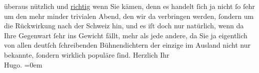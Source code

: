 \begin{ledgroupsized}[t]{13cm}
               überaus nützlich und \uline{richtig} wenn Sie {\pb}kämen, denn es handelt ſich ja
               nicht ſo ſehr um den mehr minder trivialen Abend, den wir da verbringen werden,
               ſondern um die Rückwirkung nach der Schweiz hin,
               und es iſt doch nur natürlich, wenn da Ihre Gegenwart ſehr ins Gewicht fällt, mehr
               als jede andere, da Sie ja eigentlich von allen deutſch ſchreibenden Bühnendichtern
               der einzige \introOben{}im Ausland\introOben{} nicht nur bekannte, ſondern wirklich
               populäre ſind.\pend
           \pstart
           Herzlich Ihr{\\[\baselineskip]}\spacefill\mbox{Hugo.}\pend
           \leftskip=0em{}\endnumbering{}\end{ledgroupsized}  \newcommand{\dateiname}{L02259}\newcommand{\titel}{Hugo von Hofmannsthal an Arthur Schnitzler, 30. 4. [1917]}\newcommand{\editorInnen}{Martin Anton Müller und Gerd-Hermann Susen}
      